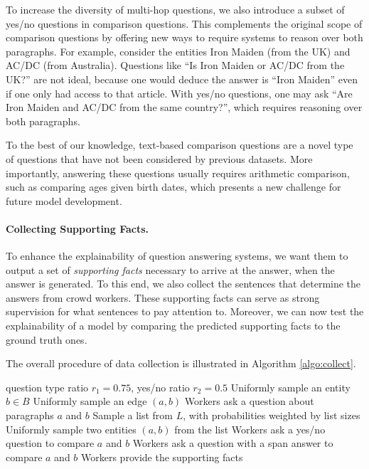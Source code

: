 To increase the diversity of multi-hop questions, we also introduce a subset of yes/no questions in comparison questions. This complements the original scope of comparison questions by offering new ways to require systems to reason over both paragraphs. For example, consider the entities Iron Maiden (from the UK) and AC/DC (from Australia). Questions like ``Is Iron Maiden or AC/DC from the UK?'' are not ideal, because one would deduce the answer is ``Iron Maiden'' even if one only had access to that article. With yes/no questions, one may ask ``Are Iron Maiden and AC/DC from the same country?'', which requires reasoning over both paragraphs.

To the best of our knowledge, text-based comparison questions are a novel type of questions that have not been considered by previous datasets. More importantly, answering these questions usually requires arithmetic comparison, such as comparing ages given birth dates, which presents a new challenge for future model development.

\paragraph{Collecting Supporting Facts.} To enhance the explainability of question answering systems, we want them to output a set of \emph{supporting facts} necessary to arrive at the answer, when the answer is generated. To this end, we also collect the sentences that determine the answers from crowd workers. These supporting facts can serve as strong supervision for what sentences to pay attention to. Moreover, we can now test the explainability of a model by comparing the predicted supporting facts to the ground truth ones.

The overall procedure of data collection is illustrated in Algorithm \ref{algo:collect}.

\begin{algorithm}[t]
\small
    \caption{Overall data collection procedure}
    \label{algo:collect}
\begin{algorithmic}
     question type ratio $r_1=0.75$, yes/no ratio $r_2=0.5$
            \STATE Uniformly sample an entity $b \in B$
            \STATE Uniformly sample an edge $(a, b)$
            \STATE Workers ask a question about paragraphs $a$ and $b$
        \ELSE
            \STATE Sample a list from $L$, with probabilities weighted by list sizes \STATE Uniformly sample two entities $(a, b)$ from the list 
                \STATE Workers ask a yes/no question to compare $a$ and $b$
            \ELSE
                \STATE Workers ask a question with a span answer to compare $a$ and $b$
            \ENDIF
        \ENDIF \STATE Workers provide the supporting facts \ENDWHILE
\end{algorithmic}
\end{algorithm}

